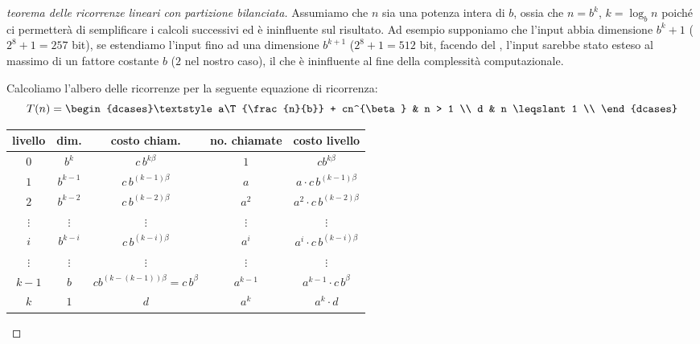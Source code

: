 \begin{proof}[teorema delle ricorrenze lineari con partizione bilanciata]
Assumiamo che \(n\) sia una potenza intera di \(b\), ossia che \(n = b^k\), \(k = \log_b n\) poiché ci permetterà di semplificare i calcoli successivi ed è ininfluente sul risultato.
Ad esempio supponiamo che l'input abbia dimensione \(b^k + 1\) (\(2^8 + 1 = 257\) bit), se estendiamo l'input fino ad una dimensione \(b^{k+1}\) (\(2^8+1 = 512\) bit, facendo del , l'input sarebbe stato esteso al massimo di un fattore costante \(b\) (\(2\) nel nostro caso), il che è ininfluente al fine della complessità computazionale.

Calcoliamo l'albero delle ricorrenze per la seguente equazione di ricorrenza:
\[
	T(n) =
	\begin{dcases}\textstyle
		a\T{\frac{n}{b}} + cn^{\beta} & n > 1 \\
		d & n \leqslant 1 \\
	\end{dcases}
\]

\clearpage
\begin{center}
	\begin{tabular}{@{} *{5}{c} @{}}
		\toprule
			livello & dim. & costo chiam. & no. chiamate & costo livello \\
		\midrule
			\(0\) & \(b^k\) & \(c\,b^{k\beta}\) & \(1\) & \(cb^{k\beta}\) \\
		\addlinespace
			\(1\) & \(b^{k-1}\) & \(c\,b^{(k-1)\beta}\) & \(a\)  & \(a \cdot c\, b^{(k-1)\beta}\)\\
		\addlinespace
			\(2\) & \(b^{k-2}\) & \(c\,b^{(k-2)\beta}\) & \(a^2\) & \(a^2 \cdot c\, b^{(k-2)\beta}\)\\
		\addlinespace
			\(\vdots\) & \(\vdots\) & \(\vdots\) & \(\vdots\) & \(\vdots\) \\
		\addlinespace
			\(i\) & \(b^{k-i}\) & \(c\,b^{(k-i)\beta}\) & \(a^i\) & \(a^i \cdot c\, b^{(k-i)\beta}\)\\
		\addlinespace
			\(\vdots\) & \(\vdots\) & \(\vdots\) & \(\vdots\) & \(\vdots\) \\
		\addlinespace
			\(k-1\) & \(b\) & \(c b^{(k-(k-1))\beta} = c\,b^{\beta}\) & \(a^{k-1}\) & \(a^{k-1} \cdot c\, b^{\beta}\) \\
		\addlinespace
			\(k\) & \(1\) & \(d\) & \(a^k\) & \(a^k \cdot d\) \\
		\bottomrule
	\end{tabular}
\end{center}


\end{proof}

